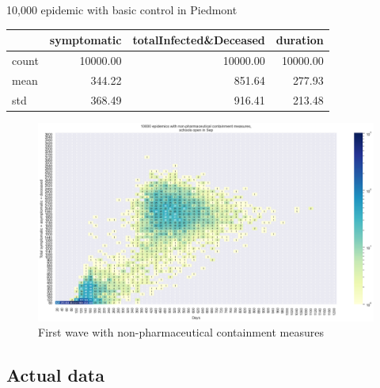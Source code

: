 \documentclass[9pt]{beamer}
\begin{document}
\begin{frame}{10,000 epidemic with basic control in Piedmont}


\begin{table}[H]
\center
\tiny

\begin{tabular}{lrrr}
\toprule
{} &  symptomatic &  totalInfected\&Deceased &  duration \\
\midrule
count &     10000.00 &                10000.00 &  10000.00 \\
mean  &       344.22 &                  851.64 &    277.93 \\
std   &       368.49 &                  916.41 &    213.48 \\
\bottomrule
\end{tabular}

\label{basicCTab}
\end{table}

\begin{figure}[H]
\center
\includegraphics[scale=0.22]{10kBasicC.png}
\caption{First wave with non-pharmaceutical containment measures} 
\label{basicC}
\end{figure}

\end{frame}


\subsection{Actual data}
\end{document}
